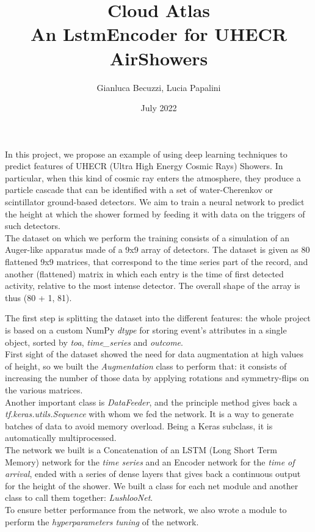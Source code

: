 \documentclass{article}
\title{Cloud Atlas \\[1ex] \large An LstmEncoder for UHECR AirShowers}
\author{Gianluca Becuzzi, Lucia Papalini}
\date{July 2022}
\begin{document}
\maketitle

In this project, we propose an example of using deep learning techniques to predict features of UHECR 
(Ultra High Energy Cosmic Rays) Showers.
In particular, when this kind of cosmic ray enters the atmosphere, they produce a particle cascade 
that can be identified with a set of water-Cherenkov or scintillator ground-based detectors. We aim to train a neural network to predict the height at which the shower formed by feeding it with data on the triggers of such detectors.\\
The dataset on which we perform the training consists of a simulation of an Auger-like apparatus 
made of a 9x9 array of detectors. The dataset is given as 80 flattened 9x9 matrices, that correspond to the time series part of the record, and another (flattened) matrix
in which each entry is the time of first detected activity, relative to the most intense detector.
The overall shape of the array is thus (80 + 1, 81).

The first step is splitting the dataset into the different features: the whole project is based on a custom NumPy \textit{dtype} for storing event's attributes in a single object, sorted by \textit{toa}, \textit{time\_series} and \textit{outcome}.\\
First sight of the dataset showed the need for data augmentation at high values of height, so we built the \textit{Augmentation} class to perform that: it consists of increasing the number of those data by applying rotations and symmetry-flips on the various matrices.\\
Another important class is \textit{DataFeeder}, and the principle method gives back a \textit{tf.keras.utils.Sequence} 
with whom we fed the network. It is a way to generate batches of data to avoid memory overload. Being a Keras subclass, it is automatically multiprocessed.\\
The network we built is a Concatenation of an LSTM (Long Short Term Memory) network for the \textit{time series} and an Encoder network for the \textit{time of arrival}, ended with a series of dense layers that gives back a continuous output for the height of the shower. We built a class for each net module and another class to call them together: \textit{LushlooNet}.\\
To ensure better performance from the network, we also wrote a module to perform the \textit{hyperparameters tuning} of the network.
\end{document}
